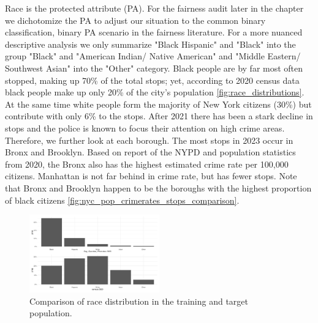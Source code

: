 Race is the protected attribute (PA). For the fairness audit later in the chapter we dichotomize the PA to adjust our situation to the common binary classification, binary PA scenario in the fairness literature. For a more nuanced descriptive analysis we only summarize "Black Hispanic" and "Black" into the group "Black" and  "American Indian/ Native American" and "Middle Eastern/ Southwest Asian" into the "Other" category.  
Black people are by far most often stopped, making up 70\% of the total stops; yet, according to 2020 census data black people make up only 20\% of the city's population \autoref{fig:race_distributions}. At the same time white people form the majority of New York citizens (30\%) but contribute with only 6\% to the stops. 
After 2021 there has been a stark decline in stops and the police is known to focus their attention on high crime areas. Therefore, we further look at each borough. 
The most stops in 2023 occur in Bronx and Brooklyn. Based on report of the NYPD and population statistics from 2020, the Bronx also has the highest estimated crime rate per 100,000 citizens. Manhattan is not far behind in crime rate, but has fewer stops. Note that Bronx and Brooklyn happen to be the boroughs with the highest proportion of black citizens \autoref{fig:nyc_pop_crimerates_stops_comparison}. 
\begin{figure}
  \includegraphics[width=0.5\textwidth]{../figures/sqf_case_study_plot6.png}
  \caption{Comparison of race distribution in the training and target population.}
  \label{fig:race_distributions}
\end{figure}

